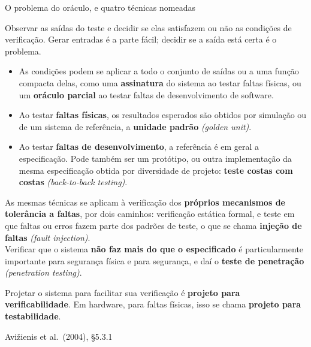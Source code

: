 \documentclass{beamer}
\newcommand{\en}[1]{{\color{depCinza}\textit{#1}}}
\newcommand{\sect}[1]{\par\smallskip\hfill{\tiny\color{black!55}Avi\v{z}ienis et al.\ (2004), #1}}
\begin{document}
\begin{frame}{O problema do or\'aculo, e quatro t\'ecnicas nomeadas}
    \footnotesize
    \begin{defi}[Problema do or\'aculo \en{(oracle problem)}]
        \scriptsize
        Observar as sa\'idas do teste e decidir se elas satisfazem ou n\~ao as condi\c{c}\~oes de verifica\c{c}\~ao. Gerar entradas \'e a parte f\'acil; decidir se a sa\'ida est\'a certa \'e o problema.
    \end{defi}
    \medskip
    \begin{itemize}
        \item As condi\c{c}\~oes podem se aplicar a todo o conjunto de sa\'idas ou a uma fun\c{c}\~ao compacta delas, como uma \textbf{assinatura} do sistema ao testar faltas f\'isicas, ou um \textbf{or\'aculo parcial} ao testar faltas de desenvolvimento de software.
        \item Ao testar \textbf{faltas f\'isicas}, os resultados esperados s\~ao obtidos por simula\c{c}\~ao ou de um sistema de refer\^encia, a \textbf{unidade padr\~ao} \en{(golden unit)}.
        \item Ao testar \textbf{faltas de desenvolvimento}, a refer\^encia \'e em geral a especifica\c{c}\~ao. Pode tamb\'em ser um prot\'otipo, ou outra implementa\c{c}\~ao da mesma especifica\c{c}\~ao obtida por diversidade de projeto: \textbf{teste costas com costas} \en{(back-to-back testing)}.
    \end{itemize}
    \medskip
    \begin{tcolorbox}[colback=depVerde!6,colframe=depVerde!60,boxrule=0.6pt]
        \scriptsize
        As mesmas t\'ecnicas se aplicam \`a verifica\c{c}\~ao dos \textbf{pr\'oprios mecanismos de toler\^ancia a faltas}, por dois caminhos: verifica\c{c}\~ao est\'atica formal, e teste em que faltas ou erros fazem parte dos padr\~oes de teste, o que se chama \textbf{inje\c{c}\~ao de faltas} \en{(fault injection)}.\\[3pt]
        Verificar que o sistema \textbf{n\~ao faz mais do que o especificado} \'e particularmente importante para seguran\c{c}a f\'isica e para seguran\c{c}a, e da\'i o \textbf{teste de penetra\c{c}\~ao} \en{(penetration testing)}.
    \end{tcolorbox}
    \smallskip
    {\scriptsize Projetar o sistema para facilitar sua verifica\c{c}\~ao \'e \textbf{projeto para verificabilidade}. Em hardware, para faltas f\'isicas, isso se chama \textbf{projeto para testabilidade}.}
    \sect{\S5.3.1}
\end{frame}
\end{document}
